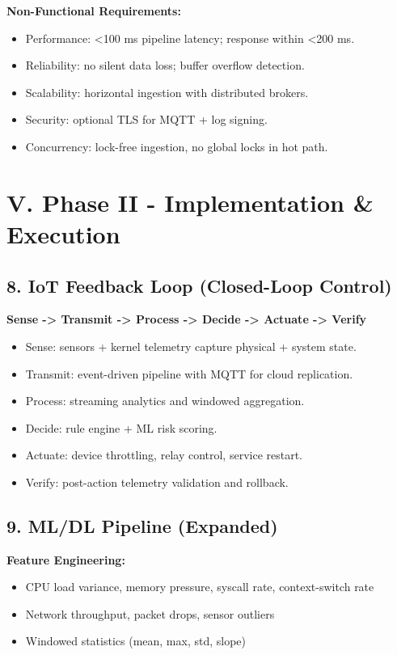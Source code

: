 \documentclass[11pt]{article}
\begin{document}
\textbf{Non-Functional Requirements:}
\begin{itemize}
    \item Performance: \textless 100 ms pipeline latency; response within \textless 200 ms.
    \item Reliability: no silent data loss; buffer overflow detection.
    \item Scalability: horizontal ingestion with distributed brokers.
    \item Security: optional TLS for MQTT + log signing.
    \item Concurrency: lock-free ingestion, no global locks in hot path.
\end{itemize}

\section{V. Phase II - Implementation \& Execution}

\subsection{8. IoT Feedback Loop (Closed-Loop Control)}
\textbf{Sense -> Transmit -> Process -> Decide -> Actuate -> Verify}
\begin{itemize}
    \item Sense: sensors + kernel telemetry capture physical + system state.
    \item Transmit: event-driven pipeline with MQTT for cloud replication.
    \item Process: streaming analytics and windowed aggregation.
    \item Decide: rule engine + ML risk scoring.
    \item Actuate: device throttling, relay control, service restart.
    \item Verify: post-action telemetry validation and rollback.
\end{itemize}

\subsection{9. ML/DL Pipeline (Expanded)}
\textbf{Feature Engineering:}
\begin{itemize}
    \item CPU load variance, memory pressure, syscall rate, context-switch rate
    \item Network throughput, packet drops, sensor outliers
    \item Windowed statistics (mean, max, std, slope)
\end{itemize}
\end{document}
